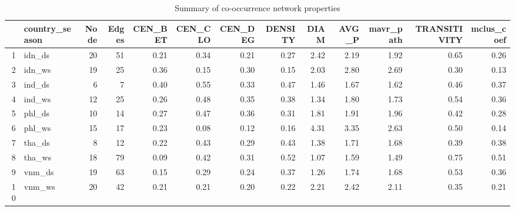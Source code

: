 \begin{landscape}
\begin{table}
\centering
\begin{tabular}{rlrrrrrrrrrrr}
  \hline
 & country\_season & Node & Edges & CEN\_BET & CEN\_CLO & CEN\_DEG & DENSITY & DIAM & AVG\_P & mavr\_path & TRANSITIVITY & mclus\_coef \\ 
  \hline
1 & idn\_ds &  20 & 51 & 0.21 & 0.34 & 0.21 & 0.27 & 2.42 & 2.19 & 1.92 & 0.65 & 0.26 \\ 
  2 & idn\_ws &  19 & 25 & 0.36 & 0.15 & 0.30 & 0.15 & 2.03 & 2.80 & 2.69 & 0.30 & 0.13 \\ 
  3 & ind\_ds &   6 & 7 & 0.40 & 0.55 & 0.33 & 0.47 & 1.46 & 1.67 & 1.62 & 0.46 & 0.37 \\ 
  4 & ind\_ws &  12 & 25 & 0.26 & 0.48 & 0.35 & 0.38 & 1.34 & 1.80 & 1.73 & 0.54 & 0.36 \\ 
  5 & phl\_ds &  10 & 14 & 0.27 & 0.47 & 0.36 & 0.31 & 1.81 & 1.91 & 1.96 & 0.42 & 0.28 \\ 
  6 & phl\_ws &  15 & 17 & 0.23 & 0.08 & 0.12 & 0.16 & 4.31 & 3.35 & 2.63 & 0.50 & 0.14 \\ 
  7 & tha\_ds &   8 & 12 & 0.22 & 0.43 & 0.29 & 0.43 & 1.38 & 1.71 & 1.68 & 0.39 & 0.38 \\ 
  8 & tha\_ws &  18 & 79 & 0.09 & 0.42 & 0.31 & 0.52 & 1.07 & 1.59 & 1.49 & 0.75 & 0.51 \\ 
  9 & vnm\_ds &  19 & 63 & 0.15 & 0.29 & 0.24 & 0.37 & 1.26 & 1.74 & 1.68 & 0.53 & 0.36 \\ 
  10 & vnm\_ws &  20 & 42 & 0.21 & 0.21 & 0.20 & 0.22 & 2.21 & 2.42 & 2.11 & 0.35 & 0.21 \\ 
   \hline
\end{tabular}
\caption{Summary of co-occurrence network properties}
\label{table:Network_stat}
\end{table}
\end{landscape}

